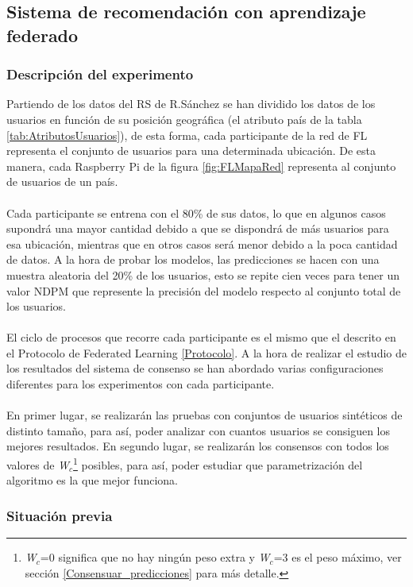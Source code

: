 \subsection{Sistema de recomendación con aprendizaje federado}

\subsubsection{Descripción del experimento}
Partiendo de los datos del RS de R.Sánchez se han dividido los datos de los usuarios en función de su posición geográfica (el atributo país de la tabla \ref{tab:AtributosUsuarios}), de esta forma, cada participante de la red de FL representa el conjunto de usuarios para una determinada ubicación. De esta manera, cada Raspberry Pi de la figura \ref{fig:FLMapaRed} representa al conjunto de usuarios de un país.
\\\\
Cada participante se entrena con el 80\% de sus datos, lo que en algunos casos supondrá una mayor cantidad debido a que se dispondrá de más usuarios para esa ubicación, mientras que en otros casos será menor debido a la poca cantidad de datos. A la hora de probar los modelos, las predicciones se hacen con una muestra aleatoria del 20\% de los usuarios, esto se repite cien veces para tener un valor NDPM que represente la precisión del modelo respecto al conjunto total de los usuarios.
\\ \\
El ciclo de procesos que recorre cada participante es el mismo que el descrito en el Protocolo de Federated Learning \ref{Protocolo}. A la hora de realizar el estudio de los resultados del sistema de consenso se han abordado varias configuraciones diferentes para los experimentos con cada participante.
\\\\
En primer lugar, se realizarán las pruebas con conjuntos de usuarios sintéticos de distinto tamaño, para así, poder analizar con cuantos usuarios se consiguen los mejores resultados. En segundo lugar, se realizarán los consensos con todos los valores de \textit{W$_c$}\footnote{\textit{W$_c$}=0 significa que no hay ningún peso extra y \textit{W$_c$}=3 es el peso máximo, ver sección \ref{Consensuar_predicciones} para más detalle.} posibles, para así, poder estudiar que parametrización del algoritmo es la que mejor funciona.

\subsubsection{Situación previa}

